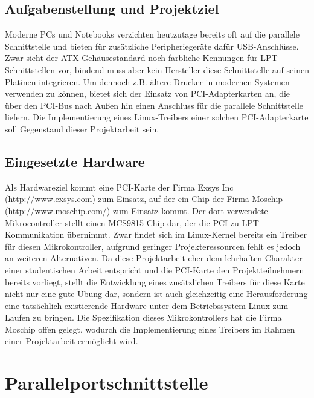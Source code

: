 \documentclass[a4paper,11pt]{article}
\begin{document}
 
\subsection{Aufgabenstellung und Projektziel}

Moderne PCs und Notebooks verzichten heutzutage bereits oft auf die parallele Schnittstelle und bieten für zusätzliche Peripheriegeräte dafür USB-Anschlüsse. Zwar sieht der ATX-Gehäusestandard noch farbliche Kennungen für LPT-Schnittstellen vor, bindend muss aber kein Hersteller diese Schnittstelle auf seinen Platinen integrieren. Um dennoch z.B. ältere Drucker in modernen Systemen verwenden zu können, bietet sich der Einsatz von PCI-Adapterkarten an, die über den PCI-Bus nach Außen hin einen Anschluss für die parallele Schnittstelle liefern. Die Implementierung eines Linux-Treibers einer solchen PCI-Adapterkarte soll Gegenstand dieser Projektarbeit sein. 

\subsection{Eingesetzte Hardware}  

Als Hardwareziel kommt eine PCI-Karte der Firma Exsys Inc (http://www.exsys.com) zum Einsatz, auf der ein Chip der Firma Moschip (http://www.moschip.com/) zum Einsatz kommt. Der dort verwendete Mikrocontroller stellt einen MCS9815-Chip dar, der die PCI zu LPT-Kommunikation übernimmt. Zwar findet sich im Linux-Kernel bereits ein Treiber für diesen Mikrokontroller, aufgrund geringer Projekteressourcen fehlt es jedoch an weiteren Alternativen. Da diese Projektarbeit eher dem lehrhaften Charakter einer studentischen Arbeit entspricht und die PCI-Karte den Projektteilnehmern bereits vorliegt, stellt die Entwicklung eines zusätzlichen Treibers für diese Karte nicht nur eine gute Übung dar, sondern ist auch gleichzeitig eine Herausforderung eine tatsächlich existierende Hardware unter dem Betriebssystem Linux zum Laufen zu bringen. Die Spezifikation dieses Mikrokontrollers hat die Firma Moschip offen gelegt, wodurch die Implementierung eines Treibers im Rahmen einer Projektarbeit ermöglicht wird.    


\section{Parallelportschnittstelle}
\end{document}
